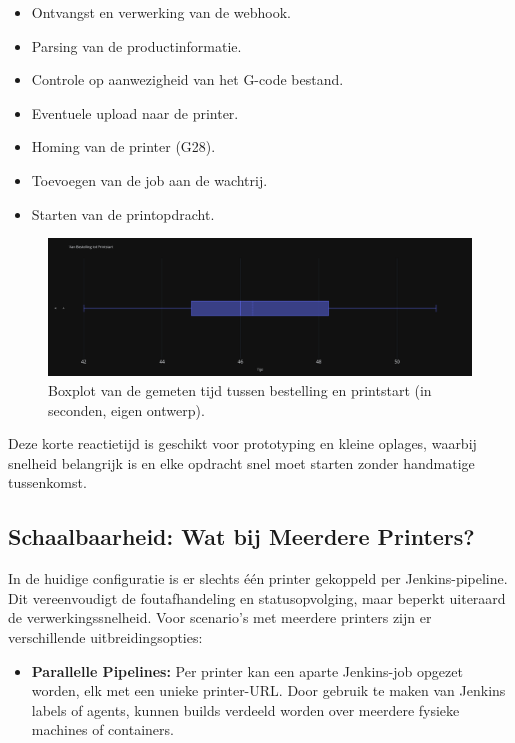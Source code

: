 \begin{enumerate}
\begin{itemize}
    \item Ontvangst en verwerking van de webhook.
    \item Parsing van de productinformatie.
    \item Controle op aanwezigheid van het G-code bestand.
    \item Eventuele upload naar de printer.
    \item Homing van de printer (G28).
    \item Toevoegen van de job aan de wachtrij.
    \item Starten van de printopdracht.
\end{itemize}

\begin{figure}[H]
    \centering
    \includegraphics[width=1\textwidth]{foto's/Grafieken/Van Bestelling tot Printstart.png}
    \caption{Boxplot van de gemeten tijd tussen bestelling en printstart (in seconden, eigen ontwerp).}
    \label{fig:timing_boxplot}
\end{figure}


Deze korte reactietijd is geschikt voor prototyping en kleine oplages, waarbij snelheid belangrijk is en elke opdracht snel moet starten zonder handmatige tussenkomst.

\subsection{Schaalbaarheid: Wat bij Meerdere Printers?}

In de huidige configuratie is er slechts één printer gekoppeld per Jenkins-pipeline. Dit vereenvoudigt de foutafhandeling en statusopvolging, maar beperkt uiteraard de verwerkingssnelheid. Voor scenario’s met meerdere printers zijn er verschillende uitbreidingsopties:

\begin{itemize}
    \item \textbf{Parallelle Pipelines:} Per printer kan een aparte Jenkins-job opgezet worden, elk met een unieke printer-URL. Door gebruik te maken van Jenkins labels of agents, kunnen builds verdeeld worden over meerdere fysieke machines of containers.
    

\end{itemize}
\end{enumerate}
